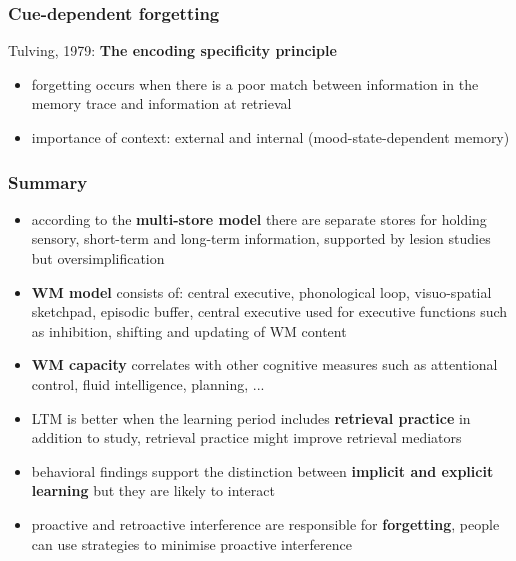 \documentclass[]{beamer}
\begin{document}
\begin{frame}
 \frametitle{Cue-dependent forgetting}
\begin{overlayarea}{110mm}{80mm}
 Tulving, 1979: \textbf{The encoding specificity principle}
\begin{itemize}
 \item forgetting occurs when there is a poor match between information in the memory trace and information at retrieval
 \item importance of context: external and internal (mood-state-dependent memory)
\end{itemize}
\end{overlayarea}
\end{frame} 



\begin{frame}
 \frametitle{Summary}
\begin{itemize}[<+->]
\setlength{\itemsep}{2pt}
 \item according to the \textbf{multi-store model} there are separate stores for holding sensory, short-term and long-term information, supported by lesion studies but oversimplification

 \item \textbf{WM model} consists of: central executive, phonological loop, visuo-spatial sketchpad, episodic buffer, central executive used for executive functions such as inhibition, shifting and updating of WM content

 \item \textbf{WM capacity} correlates with other cognitive measures such as attentional control, fluid intelligence, planning, ...

 \item LTM is better when the learning period includes \textbf{retrieval practice} in addition to study, retrieval practice might improve retrieval mediators

 \item behavioral findings support the distinction between \textbf{implicit and explicit learning} but they are likely to interact
 
 \item proactive and retroactive interference are responsible for \textbf{forgetting}, people can use strategies to minimise proactive interference 
\end{itemize}
\end{frame}
\end{document}
